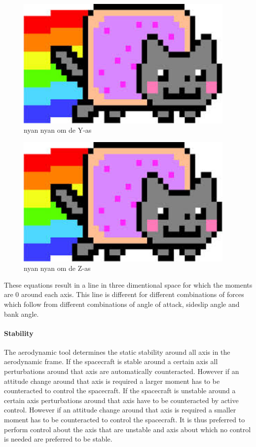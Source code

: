 \begin{figure}
	\centering
	\includegraphics[width=0.95\textwidth]{./Figure/Nyan}
	\caption{nyan nyan om de Y-as}
	\label{fig:momy}
\end{figure}

\begin{figure}
	\centering
	\includegraphics[width=0.95\textwidth]{./Figure/Nyan}
	\caption{nyan nyan om de Z-as}
	\label{fig:momz}
\end{figure}

These equations result in a line in three dimentional space for which the moments are 0 around each axis. This line is different for different combinations of forces which follow from different combinations of angle of attack, sideslip angle and bank angle.

\paragraph{Stability}
\label{control:stab}
The aerodynamic tool determines the static stability around all axis in the aerodynamic frame. If the spacecraft is stable around a certain axis all perturbations around that axis are automatically counteracted. However if an attitude change around that axis is required a larger moment has to be counteracted to control the spacecraft.  If the spacecraft is unstable around a certain axis perturbations around that axis have to be counteracted by active control. However if an attitude change around that axis is required a smaller moment has to be counteracted to control the spacecraft. It is thus preferred to perform control about the axis that are unstable and axis about which no control is needed are preferred to be stable.

